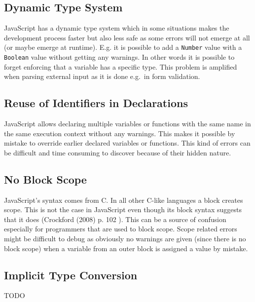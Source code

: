 	\subsection{Dynamic Type System} %
	\label{sub:dynamic_type_system}
		JavaScript has a dynamic type system which in some situations makes the development process faster but also less safe as some errors will not emerge at all (or maybe emerge at runtime). E.g. it is possible to add a \texttt{Number} value with a \texttt{Boolean} value without getting any warnings. In other words it is possible to forget enforcing that a variable has a specific type. This problem is amplified when parsing external input as it is done e.g.\ in form validation.

	\subsection{Reuse of Identifiers in Declarations} %
	\label{sec:reuse_of_identifiers_in_declarations}
		JavaScript allows declaring multiple variables or functions with the same name in the same execution context without any warnings. This makes it possible by mistake to override earlier declared variables or functions. This kind of errors can be difficult and time consuming to discover because of their hidden nature.

	\subsection{No Block Scope} %
	\label{sub:no_block_scope}
		JavaScript's syntax comes from C. In all other C-like languages a block creates scope. This is not the case in JavaScript even though its block syntax suggests that it does (Crockford (2008) p. 102 \cite{good_parts}). This can be a source of confusion especially for programmers that are used to block scope. Scope related errors might be difficult to debug as obviously no warnings are given (since there is no block scope) when a variable from an outer block is assigned a value by mistake.

	\subsection{Implicit Type Conversion} %
	\label{sub:implicit_type_conversion}
	TODO

